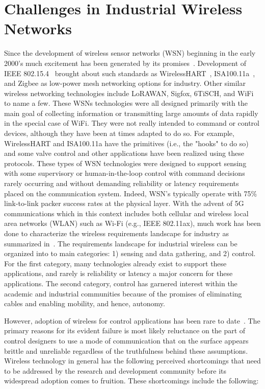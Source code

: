 {\section{Challenges in Industrial Wireless Networks}
Since the development of wireless sensor networks (WSN) beginning in the early 2000's much excitement has been generated by its promises~\cite{OnWorld2014}.   Development of IEEE 802.15.4~\cite{wiki:ieee802.15.4} brought about such standards as WirelessHART~\cite{Song2008}, ISA100.11a~\cite{ISA100.11a}, and Zigbee as low-power mesh networking options for industry.  Other similar wireless networking technologies include LoRAWAN, Sigfox, 6TiSCH, and WiFi to name a few.  These WSNs technologies were all designed primarily with the main goal of collecting information or transmitting large amounts of data rapidly in the special case of WiFi.  They were not really intended to command or control devices, although they have been at times adapted to do so.  For example, WirelessHART and ISA100.11a have the primitives (i.e., the "hooks" to do so) and some valve control and other applications have been realized using these protocols.  These types of WSN technologies were designed to support sensing with some supervisory or human-in-the-loop control with command decisions rarely occurring and without demanding reliability or latency requirements placed on the communication system.  Indeed, WSN's typically operate with 75\% link-to-link packer success rates at the physical layer.  With the advent of 5G communications which in this context includes both cellular and wireless local area networks (WLAN) such as Wi-Fi (e.g., IEEE 802.11ax), much work has been done to characterize the wireless requirements landscape for industry as summarized in~\cite{Montgomery2019}.  The requirements landscape for industrial wireless can be organized into to main categories: 1) sensing and data gathering, and 2) control.  For the first category, many technologies already exist to support these applications, and rarely is reliability or latency a major concern for these applications.  The second category, control has garnered interest within the academic and industrial communities because of the promises of eliminating cables and enabling mobility, and hence, autonomy.  

However, adoption of wireless for control applications has been rare to date~\cite{Martinez2019}.  The primary reasons for its evident failure is most likely reluctance on the part of control designers to use a mode of communication that on the surface appears brittle and unreliable regardless of the truthfulness behind these assumptions.  Wireless technology in general has the following perceived shortcomings that need to be addressed by the research and development community before its widespread adoption comes to fruition.  These shortcomings include the following:

}
